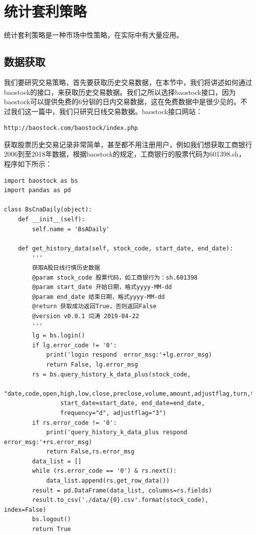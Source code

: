\documentclass{article}
\begin{document}
\section{统计套利策略}
统计套利策略是一种市场中性策略，在实际中有大量应用。
\subsection{数据获取}
我们要研究交易策略，首先要获取历史交易数据，在本节中，我们将讲述如何通过baostock的接口，来获取历史交易数据。我们之所以选择baostock接口，因为baostock可以提供免费的6分钏的日内交易数据，这在免费数据中是很少见的。不过我们这一篇中，我们只研究日线交易数据。baostock接口网站：
\lstset{language=BASH}
\begin{lstlisting}
http://baostock.com/baostock/index.php
\end{lstlisting}
获取股票历史交易记录非常简单，甚至都不用注册用户，例如我们想获取工商银行2006到至2018年数据，根据baostock的规定，工商银行的股票代码为601398.sh，程序如下所示：
\begin{lstlisting}
import baostock as bs
import pandas as pd

class BsCnaDaily(object):
    def __init__(self):
        self.name = 'BsADaily'
        
    def get_history_data(self, stock_code, start_date, end_date):
        '''
        获取A股日线行情历史数据
        @param stock_code 股票代码，如工商银行为：sh.601398
        @param start_date 开始日期，格式yyyy-MM-dd
        @param end_date 结束日期，格式yyyy-MM-dd
        @return 获取成功返回True，否则返回False
        @version v0.0.1 闫涛 2019-04-22
        '''
        lg = bs.login()
        if lg.error_code != '0':
            print('login respond  error_msg:'+lg.error_msg)
            return False, lg.error_msg
        rs = bs.query_history_k_data_plus(stock_code,
                "date,code,open,high,low,close,preclose,volume,amount,adjustflag,turn,tradestatus,pctChg,isST",
                start_date=start_date, end_date=end_date,
                frequency="d", adjustflag="3")
        if rs.error_code != '0':
            print('query_history_k_data_plus respond  error_msg:'+rs.error_msg)
            return False,rs.error_msg
        data_list = []
        while (rs.error_code == '0') & rs.next():
            data_list.append(rs.get_row_data())
        result = pd.DataFrame(data_list, columns=rs.fields)
        result.to_csv('./data/{0}.csv'.format(stock_code), index=False)
        bs.logout()
        return True
\end{lstlisting}
\end{document}
